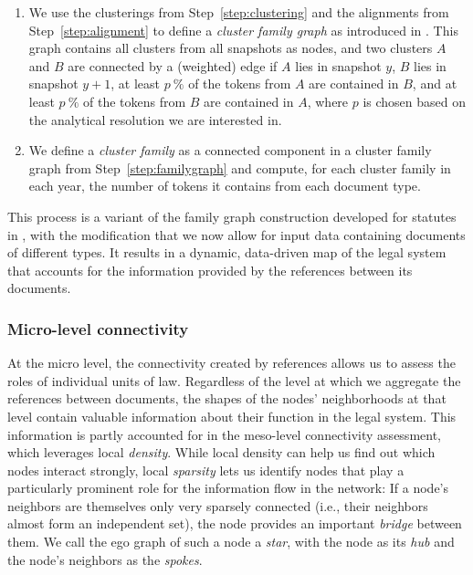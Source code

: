 \begin{enumerate}
	\item We use the clusterings from Step~\ref{step:clustering} and the alignments from Step~\ref{step:alignment} to define a \emph{cluster family graph} as introduced in \cite{katz2020}. 
	This graph contains all clusters from all snapshots as nodes, and two clusters $A$ and $B$ are connected by a (weighted) edge if $A$ lies in snapshot $y$, $B$ lies in snapshot $y+1$, at least $p~\%$ of the tokens from $A$ are contained in $B$, and at least $p~\%$ of the tokens from $B$ are contained in $A$, where $p$ is chosen based on the analytical resolution we are interested in.\label{step:familygraph}
	\item We define a \emph{cluster family} as a connected component in a cluster family graph from Step~\ref{step:familygraph} and compute, for each cluster family in each year, the number of tokens it contains from each document type.\label{step:family}
\end{enumerate}
This process is a variant of the family graph construction developed for statutes in \cite{katz2020}, 
with the modification that we now allow for input data containing documents of different types.
It results in a dynamic, data-driven map of the legal system that accounts for the information provided by the references between its documents.

\vspace*{6pt}
\subsubsection{Micro-level connectivity}
\label{subsubsec:methods:connectivity:micro}

At the micro level, the connectivity created by references allows us to assess the roles of individual units of law. 
Regardless of the level at which we aggregate the references between documents, 
the shapes of the nodes' neighborhoods at that level contain valuable information about their function in the legal system. 
This information is partly accounted for in the meso-level connectivity assessment, which leverages local \emph{density}.
While local density can help us find out which nodes interact strongly, local \emph{sparsity} lets us identify nodes that play a particularly prominent role for the information flow in the network: 
If a node's neighbors are themselves only very sparsely connected (i.e., their neighbors almost form an independent set), the node provides an important \emph{bridge} between them.
We call the ego graph of such a node a \emph{star}, 
with the node as its \emph{hub} and the node's neighbors as the \emph{spokes}.

